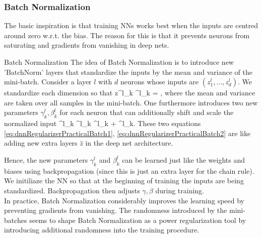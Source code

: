 \subsubsection{Batch Normalization}
 \label{subsubsec:dnnRegularizerPracticalBatchNorm}
The basic inspiration is that training NNs works best when the inputs are centred around zero w.r.t. the bias. The reason for this is that it prevents neurons from saturating and gradients from vanishing in deep nets.
\begin{mybox}{Batch Normalization}
	The idea of Batch Normalization is to introduce new ’BatchNorm’ layers that standardize the inputs by the mean and variance of the mini-batch. Consider a layer $l$ with $d$ neurons whose inputs are $(z^l_1,\dots,z^l_d)$. We standardize each dimension so that
	\be 
	\label{eq:dnnRegularizerPracticalBatch1}
	z^l_k \rightarrow {}^l_k = ,
	\ee
	where the mean and variance are taken over all samples in the mini-batch. One furthermore introduces two new parameters $\gamma^l_k, \beta^l_k$ for each neuron that can additionally shift and scale the normalized input
	\be 
	\label{eq:dnnRegularizerPracticalBatch2}
	^l_k \rightarrow \gamma^l_k ^l_k + \beta^l_k.
	\ee 
	These two equations \ref{eq:dnnRegularizerPracticalBatch1}, \ref{eq:dnnRegularizerPracticalBatch2} are like adding new extra layers $\hat{z}$ in the deep net architecture.
\end{mybox}
Hence, the new parameters $\gamma^l_k$ and $\beta^l_k$ can be learned just like the weights and biases using backpropagation (since this is just an extra layer for the chain rule). We initiliaze the NN so that at the beginning of training the inputs are being standardized. Backpropagation then adjusts $\gamma,\beta$ during training.\\
In practice, Batch Normalization considerably improves the learning speed by preventing gradients from vanishing. The randomness introduced by the mini-batches seems to shape Batch Normalization as a power regularization tool by introducing additional randomness into the training procedure.

